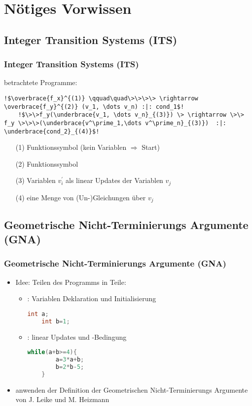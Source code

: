 \section{N{\"o}tiges Vorwissen}

\subsection{Integer Transition Systems (ITS) }
\frame{\tableofcontents[currentsection]}
\begin{frame}[fragile] %
	\frametitle{Integer Transition Systems (ITS)}
	\its betrachtete Programme:
	\begin{lstlisting}[escapechar=!]
	!$\overbrace{f_x}^{(1)} \qquad\quad\>\>\>\> \rightarrow \overbrace{f_y}^{(2)} (v_1, \dots v_n) :|: cond_1$!
	!$\>\>f_y(\underbrace{v_1, \dots v_n}_{(3)}) \> \rightarrow \>\> f_y \>\>\>(\underbrace{v^\prime_1,\dots v^\prime_n}_{(3)})  :|: \underbrace{cond_2}_{(4)}$!
	\end{lstlisting}
	
	\begin{enumerate}
		\item[(1)] Funktionssymbol (kein Variablen $\Rightarrow$ Start)
		\item[(2)] Funktionssymbol
		\item[(3)] Variablen $v^\prime_i$ als linear Updates der Variablen $v_j$
		\item[(4)] eine Menge von (Un-)Gleichungen \"uber $v_j$
	\end{enumerate}

\end{frame}

\subsection{Geometrische Nicht-Terminierungs Argumente (GNA)}
\begin{frame}[fragile]
	\frametitle{Geometrische Nicht-Terminierungs Argumente (GNA)}
	\begin{itemize}
		\item Idee: Teilen des Programms in  Teile:
			\begin{itemize}
				\item \stem: Variablen Deklaration und Initialisierung
					\begin{lstlisting}[language = java]
	int a;
	int b=1;
					\end{lstlisting}
				\item \loopt: linear Updates und -Bedingung
				\begin{lstlisting}[language = java]
	while(a+b>=4){
		a=3*a+b;
		b=2*b-5;
	}
				\end{lstlisting}
			\end{itemize}
		\item anwenden der Definition der Geometrischen Nicht-Terminierungs Argumente von J. Leike und M. Heizmann 
	\end{itemize}
\end{frame}

